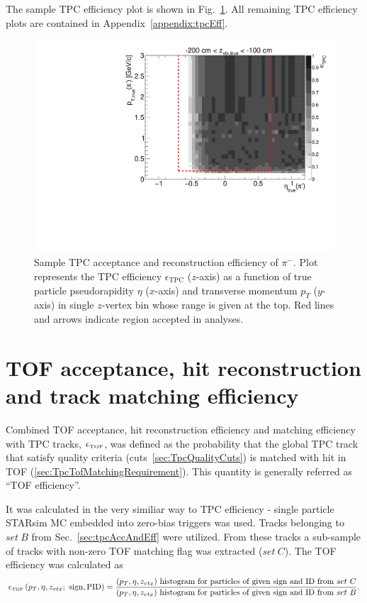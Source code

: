 The sample TPC efficiency plot is shown in Fig.~\ref{fig:tpcEff_pion_sample}. All remaining TPC efficiency plots are contained in Appendix~\ref{appendix:tpcEff}.

\begin{figure}[hb]%
\centering\includegraphics[width=0.7\linewidth,page=11]{graphics/eff/Eff2D_TPC_pion_Minus.pdf}%
\caption[Sample TPC acceptance and reconstruction efficiency of $\pi^{-}$.]{Sample TPC acceptance and reconstruction efficiency of $\pi^{-}$. Plot represents the TPC efficiency $\epsilon_{\text{TPC}}$ ($z$-axis) as a function of true particle pseudorapidity $\eta$ ($x$-axis) and transverse momentum $p_{T}$ ($y$-axis) in single $z$-vertex bin whose range is given at the top. Red lines and arrows indicate region accepted in analyses.}\label{fig:tpcEff_pion_sample}
\end{figure}






\section{TOF acceptance, hit reconstruction and track matching efficiency}\label{sec:tofMatchEff}

Combined TOF acceptance, hit reconstruction efficiency and matching efficiency with TPC tracks, $\epsilon_{\textrm{\tiny TOF}}$, was defined as the probability that the global TPC track that satisfy quality criteria (cuts~\ref{sec:TpcQualityCuts}) is matched with hit in TOF (\ref{sec:TpcTofMatchingRequirement}). This quantity is generally referred as ``TOF efficiency''.

It was calculated in the very similiar way to TPC efficiency - single particle STARsim MC embedded into zero-bias triggers was used. Tracks belonging to $set~B$ from Sec.~\ref{sec:tpcAccAndEff} were utilized. From these tracks a sub-sample of tracks with non-zero TOF matching flag was extracted ($set~C$). The TOF efficiency was calculated as
\begin{equation}\label{eq:tofAccAndEffDefinition}
		\epsilon_{\textrm{\tiny TOF}}\left(p_{T}, \eta, z_{vtx};~\textrm{sign},\textrm{PID}\right) = \frac{(p_{T},\eta, z_{vtx})~\textrm{histogram for particles of given sign and ID from}~set~C}{(p_{T},\eta, z_{vtx})~\textrm{histogram for particles of given sign and ID from}~set~B}.
	\end{equation}

